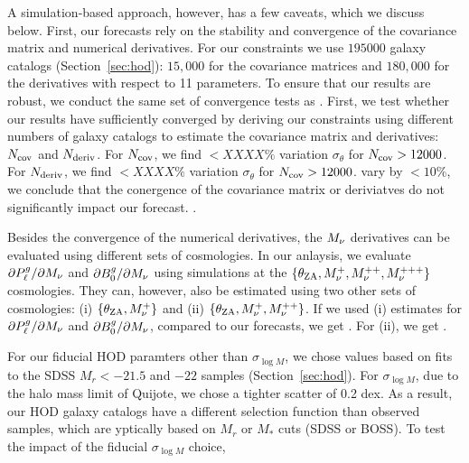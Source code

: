 A simulation-based approach, however, has a few caveats, which we discuss
below. First, our forecasts rely on the stability and convergence of the
covariance matrix and numerical derivatives. 
For our constraints we use $195000$ galaxy catalogs (Section~\ref{sec:hod}): 
$15,000$ for the covariance matrices and $180,000$ for the derivatives with 
respect to 11 parameters. To ensure that our results are robust, we conduct the
same set of convergence tests as \cite{hahn2020}. 
First, we test whether our results have sufficiently converged by deriving our 
constraints using different numbers of galaxy catalogs to estimate the covariance 
matrix and derivatives: $N_{\rm cov}$ and $N_{\rm deriv}$. For $N_{\rm cov}$,
we find $< XXXX\%$ variation $\sigma_\theta$ for $N_{\rm cov} > 12000$.
For $N_{\rm deriv}$, 
we find $< XXXX\%$ variation $\sigma_\theta$ for $N_{\rm cov} > 12000$.
vary by $< 10\%$, we conclude that the conergence of the covariance matrix or
deriviatves do not significantly impact our forecast. 
. 

Besides the convergence of the numerical derivatives, the $M_\nu$ derivatives
can be evaluated using different sets of cosmologies. In our anlaysis, we
evaluate ${\partial P^g_{\ell}}/{\partial M_\nu}$ and ${\partial B^g_0}/{\partial
M_\nu}$ using simulations at the $\{\theta_{\rm ZA}, M_\nu^+, M_\nu^{++},
M_\nu^{+++}\}$ cosmologies. They can, however, also be estimated using 
two other sets of cosmologies: (i) $\{\theta_{\rm ZA}, M_\nu^+\}$ and (ii)
$\{\theta_{\rm ZA}, M_\nu^+, M_\nu^{++}\}$. If we used (i) estimates for 
${\partial P^g_{\ell}}/{\partial M_\nu}$ and ${\partial B^g_0}/{\partial M_\nu}$, 
compared to our forecasts, we get . For (ii), we get . 

For our fiducial HOD paramters other than $\sigma_{\log M}$, we chose values 
based on \cite{zheng2007} fits to the SDSS $M_r < -21.5$  and $-22$ samples
(Section~\ref{sec:hod}). For $\sigma_{\log M}$, due to the halo mass limit of
{\sc Quijote}, we chose a tighter scatter of 0.2 dex. As a result, our HOD galaxy 
catalogs have a different selection function than observed samples, which are
yptically based on $M_r$ or $M_*$ cuts (\eg SDSS or BOSS). To test the impact
of the fiducial $\sigma_{\log M}$ choice, 


